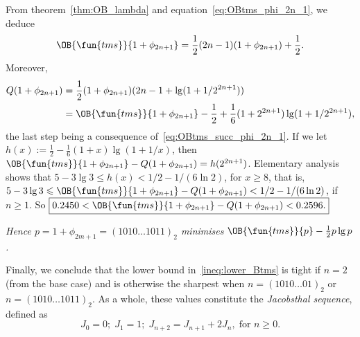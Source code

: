 \begin{itemize}
    From theorem~\ref{thm:OB_lambda} and
    equation~\eqref{eq:OBtms_phi_2n_1}, we deduce
    \begin{equation}
      \OB{\fun{tms}}{1+\phi_{2n+1}} = \frac{1}{2}(2n - 1)(1+\phi_{2n+1})
      + \frac{1}{2}.
      \label{eq:OBtms_succ_phi_2n_1}
    \end{equation}
    Moreover,
    \begin{align*}
      Q(1+\phi_{2n+1}) &= \frac{1}{2}(1+\phi_{2n+1})(2n-1 + \lg(1+1/2^{2n+1}))\\
                      &= \OB{\fun{tms}}{1+\phi_{2n+1}} - \frac{1}{2}
                         + \frac{1}{6}(1+2^{2n+1})\lg(1+1/2^{2n+1}),
    \end{align*}
    the last step being a consequence
    of~\eqref{eq:OBtms_succ_phi_2n_1}. If we let \(h(x) :=
    \tfrac{1}{2} - \tfrac{1}{6}(1+x)\lg(1+1/x)\), then
    \(\OB{\fun{tms}}{1+\phi_{2n+1}} - Q(1+\phi_{2n+1}) =
    h(2^{2n+1})\). Elementary analysis shows that \(5 - 3\lg 3
    \leqslant h(x) < 1/2 - 1/(6\ln 2)\), for \(x \geqslant 8\), that
    is, \(5 - 3\lg 3 \leqslant \OB{\fun{tms}}{1+\phi_{2n+1}} -
    Q(1+\phi_{2n+1}) < 1/2 - 1/(6\ln 2)\), if \(n \geqslant 1\). So
    \(\boxed{0.2450 < \smash{\OB{\fun{tms}}{1+\phi_{2n+1}}} -
      Q(1+\phi_{2n+1}) < 0.2596.}\)

    \bigskip
    \textsl{Hence \(p = 1+\phi_{2m+1} = (1010\dots1011)_2\) minimises
    \(\OB{\fun{tms}}{p} - \tfrac{1}{2}p\lg p\).}

\end{itemize}
Finally, we conclude that the lower bound in~\eqref{ineq:lower_Btms}
is tight if \(n=2\) (from the base case) and is otherwise the sharpest
when \(n=(1010\dots01)_2\) or \(n=(1010\dots1011)_2\). As a whole,
these values constitute the \emph{Jacobsthal
  sequence}, defined as
\begin{equation}
J_0 = 0; \; J_1=1; \; J_{n+2} = J_{n+1} + 2J_{n},\; \text{for \(n
  \geqslant 0\).}
\label{eq:Jacobsthal}
\end{equation}

